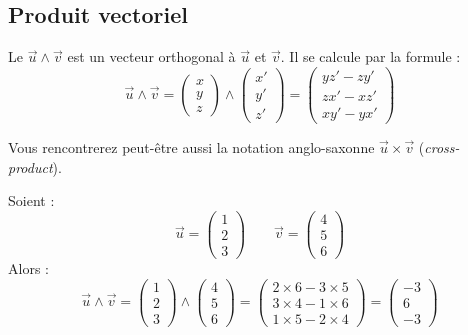 \documentclass[11pt,class=report,crop=false]{standalone}
\begin{document}
\subsection{Produit vectoriel}

Le  $\vec u \wedge \vec v$ est un vecteur orthogonal à $\vec u$ et $\vec v$.
Il se calcule par la formule :
$$\vec u \wedge \vec v = \begin{pmatrix} x \\ y \\ z \end{pmatrix} \wedge \begin{pmatrix} x' \\ y' \\ z' \end{pmatrix} =
\begin{pmatrix}
    y z' - z y' \\
    z x' - x z' \\
    x y' - y x'
\end{pmatrix}
$$


Vous rencontrerez peut-être aussi la notation anglo-saxonne $\vec u \times \vec v$ (\emph{cross-product}).

\begin{exemple}
Soient :
$$
    \vec u = \begin{pmatrix} 1 \\ 2 \\ 3 \end{pmatrix} \qquad
    \vec v = \begin{pmatrix} 4 \\ 5 \\ 6 \end{pmatrix}
$$
Alors :
$$
    \vec u \wedge \vec v = \begin{pmatrix} 1 \\ 2 \\ 3 \end{pmatrix} \wedge \begin{pmatrix} 4 \\ 5 \\ 6 \end{pmatrix} =
    \begin{pmatrix}
        2 \times 6 - 3 \times 5 \\
        3 \times 4 - 1 \times 6 \\
        1 \times 5 - 2 \times 4
    \end{pmatrix} =
    \begin{pmatrix}
        -3 \\
        6 \\
        -3
    \end{pmatrix}
$$

\end{exemple}
\end{document}
